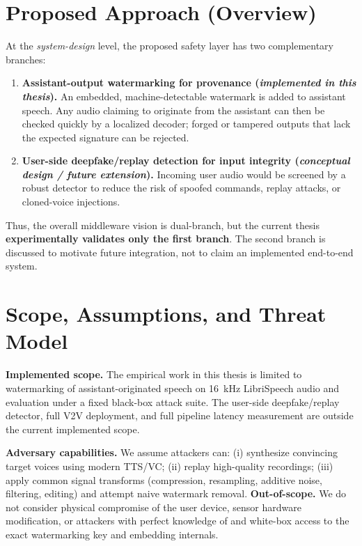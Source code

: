 \section{Proposed Approach (Overview)}
At the \emph{system-design} level, the proposed safety layer has two complementary branches:
\begin{enumerate}[leftmargin=1.25em]
  \item \textbf{Assistant-output watermarking for provenance (\emph{implemented in this thesis}).} An embedded, machine-detectable watermark is added to assistant speech. Any audio claiming to originate from the assistant can then be checked quickly by a localized decoder; forged or tampered outputs that lack the expected signature can be rejected.
  \item \textbf{User-side deepfake/replay detection for input integrity (\emph{conceptual design / future extension}).} Incoming user audio would be screened by a robust detector to reduce the risk of spoofed commands, replay attacks, or cloned-voice injections.
\end{enumerate}
Thus, the overall middleware vision is dual-branch, but the current thesis \textbf{experimentally validates only the first branch}. The second branch is discussed to motivate future integration, not to claim an implemented end-to-end system.

\section{Scope, Assumptions, and Threat Model}
\textbf{Implemented scope.} The empirical work in this thesis is limited to watermarking of assistant-originated speech on 16~kHz LibriSpeech audio and evaluation under a fixed black-box attack suite. The user-side deepfake/replay detector, full V2V deployment, and full pipeline latency measurement are outside the current implemented scope.

\textbf{Adversary capabilities.} We assume attackers can: (i) synthesize convincing target voices using modern TTS/VC; (ii) replay high-quality recordings; (iii) apply common signal transforms (compression, resampling, additive noise, filtering, editing) and attempt naive watermark removal. \textbf{Out-of-scope.} We do not consider physical compromise of the user device, sensor hardware modification, or attackers with perfect knowledge of and white-box access to the exact watermarking key and embedding internals.

